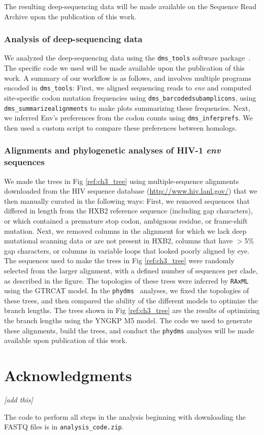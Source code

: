 \documentclass[9pt]{elife}
\newcommand{\jdbcomment}[1]{\emph{\color{red} [#1]}}
\begin{document}
The resulting deep-sequencing data will be made available on the Sequence Read Archive upon the publication of this work.

\subsubsection*{Analysis of deep-sequencing data}

We analyzed the deep-sequencing data using the \texttt{dms\_tools} software package~\cite{bloom2015software}.
The specific code we used will be made available upon the publication of this work.
A summary of our workflow is as follows, and involves multiple programs encoded in \texttt{dms\_tools}:
First, we aligned sequencing reads to \textit{env} and computed site-specific codon mutation frequencies using \texttt{dms\_barcodedsubamplicons}, using \texttt{dms\_summarizealignments} to make plots summarizing these frequencies.
Next, we inferred Env's preferences from the codon counts using \texttt{dms\_inferprefs}.
We then used a custom script to compare these preferences between homologs.

\subsubsection*{Alignments and phylogenetic analyses of HIV-1 {\it env} sequences}
We made the trees in Fig \ref{ref:ch3_tree} using multiple-sequence alignments downloaded from the HIV sequence database (\url{http://www.hiv.lanl.gov/}) that we then manually curated in the following ways:
First, we removed sequences that differed in length from the HXB2 reference sequence (including gap characters), or which contained a premature stop codon, ambiguous residue, or frame-shift mutation.
Next, we removed columns in the alignment for which we lack deep mutational scanning data or are not present in HXB2, columns that have $>$5\% gap characters, or columns in variable loops that looked poorly aligned by eye.
The sequences used to make the trees in Fig \ref{ref:ch3_tree} were randomly selected from the larger alignment, with a defined number of sequences per clade, as described in the figure.
The topologies of these trees were inferred by \texttt{RAxML} using the GTRCAT model.
In the \texttt{phydms}~\cite{hilton2017phydms} analyses, we fixed the topologies of these trees, and then compared the ability of the different models to optimize the branch lengths.
The trees shown in Fig \ref{ref:ch3_tree} are the results of optimizing the branch lengths using the YNGKP M5 model.
The code we used to generate these alignments, build the trees, and conduct the \texttt{phydms} analyses will be made available upon publication of this work.

\section{Acknowledgments}
\jdbcomment{add this}



\clearpage

\begin{suppfile}
\caption{
\label{suppfile:code}
The code to perform all steps in the analysis beginning with downloading the FASTQ files is in \texttt{analysis\_code.zip}.}
\end{suppfile}
\end{document}
